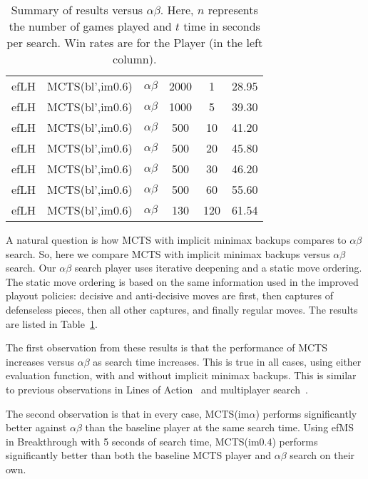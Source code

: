 \documentclass{article}
\begin{document}
\begin{table}[t]
\begin{center}
\begin{tabular}{ccccc|c}
\hline
efLH       & MCTS(bl',im$0.6$)     & $\alpha\beta$    & 2000   & 1       & 28.95      \\     
efLH       & MCTS(bl',im$0.6$)     & $\alpha\beta$    & 1000   & 5       & 39.30      \\     
efLH       & MCTS(bl',im$0.6$)     & $\alpha\beta$    &  500   & 10      & 41.20      \\     
efLH       & MCTS(bl',im$0.6$)     & $\alpha\beta$    &  500   & 20      & 45.80      \\     
efLH       & MCTS(bl',im$0.6$)     & $\alpha\beta$    &  500   & 30      & 46.20      \\     
efLH       & MCTS(bl',im$0.6$)     & $\alpha\beta$    &  500   & 60      & 55.60      \\     
efLH       & MCTS(bl',im$0.6$)     & $\alpha\beta$    &  130   & 120     & 61.54      \\     
\hline
\end{tabular}
\end{center}
\caption{Summary of results versus $\alpha\beta$. 
Here, $n$ represents the number of games played and $t$ time in seconds per search.
Win rates are for the Player (in the left column).}
\label{tbl:ab_vs_mcts}
\end{table}

A natural question is how MCTS with implicit minimax backups compares to $\alpha\beta$ search. 
So, here we compare MCTS with implicit minimax backups versus $\alpha\beta$ search.
Our $\alpha\beta$ search player uses iterative deepening and a static move ordering. 
The static move ordering is based on the same information used in the improved playout
policies: decisive and anti-decisive moves are first, then captures of defenseless pieces, 
then all other captures, and finally regular moves.
The results are listed in Table~\ref{tbl:ab_vs_mcts}.

The first observation from these results is that the performance of MCTS increases versus 
$\alpha\beta$ as search time increases. This is true in all cases, using either evaluation function, 
with and without implicit minimax backups. This is similar to previous observations in 
Lines of Action~\cite{Winands11AB} and multiplayer search~\cite{Sturtevant08icga,Nijssen13}.

The second observation is that in every case, MCTS(im$\alpha$) performs significantly better 
against $\alpha\beta$ than the baseline player at the same search time. 
Using efMS in Breakthrough with 5 seconds of search time, MCTS(im$0.4$) performs significantly 
better than both the baseline MCTS player and $\alpha\beta$ search on their own. 
\end{document}
